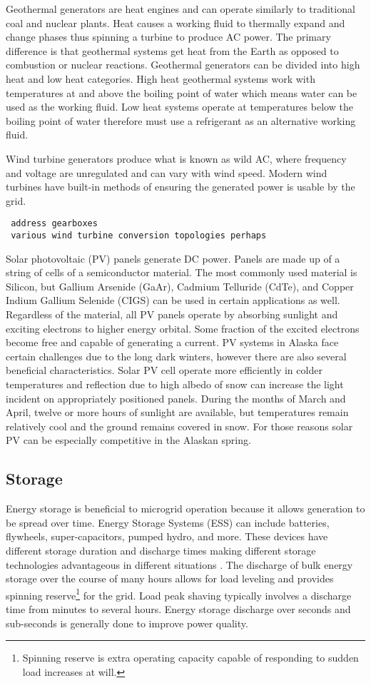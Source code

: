 Geothermal generators are heat engines and can operate similarly to traditional coal and nuclear plants. Heat causes a working fluid to thermally expand and change phases thus spinning a turbine to produce AC power. The primary difference is that geothermal systems get heat from the Earth as opposed to combustion or nuclear reactions. Geothermal generators can be divided into high heat and low heat categories. High heat geothermal systems work with temperatures at and above the boiling point of water which means water can be used as the working fluid. Low heat systems operate at temperatures below the boiling point of water therefore must use a refrigerant as an alternative working fluid. 

Wind turbine generators produce what is known as wild AC, where frequency and voltage are unregulated and can vary with wind speed. Modern wind turbines have built-in methods of ensuring the generated power is usable by the grid.
\begin{verbatim} 
 address gearboxes  
 various wind turbine conversion topologies perhaps
\end{verbatim}

Solar photovoltaic (PV) panels generate DC power. Panels are made up of a string of cells of a semiconductor material. The most commonly used material is Silicon, but Gallium Arsenide (GaAr), Cadmium Telluride (CdTe), and Copper Indium Gallium Selenide (CIGS) can be used in certain applications as well. Regardless of the material, all PV panels operate by absorbing sunlight and exciting electrons to higher energy orbital. Some fraction of the excited electrons become free and capable of generating a current. PV systems in Alaska face certain challenges due to the long dark winters, however there are also several beneficial characteristics. Solar PV cell operate more efficiently in colder temperatures and reflection due to high albedo of snow can increase the light incident on appropriately positioned panels. During the months of March and April, twelve or more hours of sunlight are available, but temperatures remain relatively cool and the ground remains covered in snow. For those reasons solar PV can be especially competitive in the Alaskan spring.

\subsection{Storage}
Energy storage is beneficial to microgrid operation because it allows generation to be spread over time. Energy Storage Systems (ESS) can include batteries, flywheels, super-capacitors, pumped hydro, and more. These devices have different storage duration and discharge times making different storage technologies advantageous in different situations \cite{Schoenung2003}. The discharge of bulk energy storage over the course of many hours allows for load leveling and provides spinning reserve\footnote{Spinning reserve is extra operating capacity capable of responding to sudden load increases at will.} for the grid. Load peak shaving typically involves a discharge time from minutes to several hours. Energy storage discharge over seconds and sub-seconds is generally done to improve power quality.

